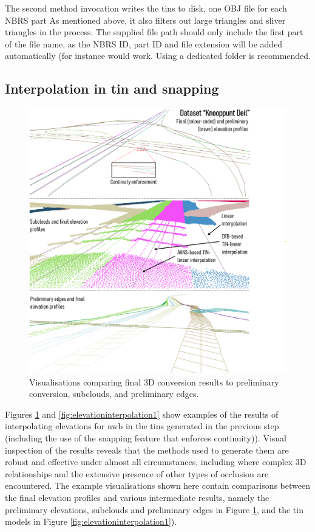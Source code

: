 The second method invocation writes the \ac{tin}s to disk, one OBJ file for each NBRS part As mentioned above, it also filters out large triangles and sliver triangles in the process. The supplied file path should only include the first part of the file name, as the NBRS ID, part ID and file extension will be added automatically (for instance  would work. Using a dedicated folder is recommended.

\subsection{Interpolation in \ac{tin} and snapping}
\label{sub:r_interpolation}

\begin{figure}
    \centering
    \includegraphics[width=\linewidth]{final_report/figs/elevationinterpolation0.png}
    \caption{Visualisations comparing final 3D conversion results to preliminary conversion, subclouds, and preliminary edges.}
    \label{fig:elevationinterpolation0}
\end{figure}

Figures \ref{fig:elevationinterpolation0} and \ref{fig:elevationinterpolation1} show examples of the results of interpolating elevations for \ac{nwb} in the \ac{tin}s generated in the previous step (including the use of the snapping feature that enforces continuity)). Visual inspection of the results reveals that the methods used to generate them are robust and effective under almost all circumstances, including where complex 3D relationships and the extensive presence of other types of occlusion are encountered. The example visualisations shown here contain comparisons between the final elevation profiles and various intermediate results, namely the preliminary elevations, subclouds and preliminary edges in Figure \ref{fig:elevationinterpolation0}, and the \ac{tin} models in Figure \ref{fig:elevationinterpolation1}).

